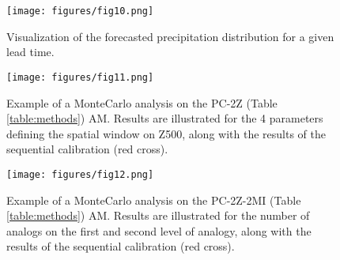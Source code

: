 \documentclass[review]{elsarticle}
\begin{document}
\begin{figure}[t]
	\texttt{[image: figures/fig10.png]}
	\caption{Visualization of the forecasted precipitation distribution for a given lead time.}
	\label{figure:atmoswing-viewer-distribution}
\end{figure}

\begin{figure}[t]
	\texttt{[image: figures/fig11.png]}
	\caption{Example of a Monte\textendash Carlo analysis on the PC-2Z (Table \ref{table:methods}) AM. Results are illustrated for the 4 parameters defining the spatial window on Z500, along with the results of the sequential calibration (red cross).}
	\label{figure:monte_carlo_r1}
\end{figure}

\begin{figure}[t]
	\texttt{[image: figures/fig12.png]}
	\caption{Example of a Monte\textendash Carlo analysis on the PC-2Z-2MI (Table \ref{table:methods}) AM. Results are illustrated for the number of analogs on the first and second level of analogy, along with the results of the sequential calibration (red cross).}
	\label{figure:monte_carlo_r2}
\end{figure}

\clearpage
\end{document}
